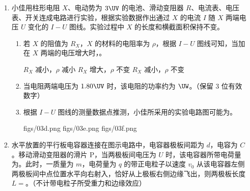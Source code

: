 \documentclass[\gkver]{gaokaozhenti}
\begin{document}
\begin{enumerate}
\begin{enumerate}
	\onepicture[align=right, w=3.17cm]{}

	\item
	小佳用柱形电阻 $X$、电动势为 $3 \UV$ 的电池、滑动变阻器 $R$、电流表、电压表、开关连成电路进行实验，根据实验数据作出通过 $X$ 的电流 $I$ 随 $X$ 两端电压 $U$ 变化的 $I-U$ 图线。实验过程中 $X$ 的长度和横截面积保持不变。

	\onepicture[align=right, w=5.59cm]{}

	\begin{enumerate}
		\item
		若 $X$ 的阻值为 $R_{X}$，$X$ 的材料的电阻率为 $\rho$，根据 $I-U$ 图线可知，当加在 $X$ 两端的电压增大时，。

		{$R_{X}$ 减小，$\rho$ 减小}
		{$R_{X}$ 增大，$\rho$ 不变}
		{$R_{X}$ 减小，$\rho$ 不变}

		\item
		当电阻两端电压为 $1.80 \UV$ 时，该电阻的功率约为 $\UW$。（保留 3 位有效数字）

		\item
		根据 $I-U$ 图线的测量数据点推测，小佳所采用的实验电路图可能为。

		{figs/03d.png}
		{figs/03e.png}
		{figs/03f.png}
	\end{enumerate}

	\item
	水平放置的平行板电容器连接在图示电路中，电容器极板间距为 $d$，电容为 $C$。移动滑动变阻器的滑片 P，当两极板间电压为 $U$ 时，该电容器所带电荷量为。此时，一质量为 $m$，电荷量为 $q$ 的带正电粒子以速度 $v_{0}$ 从该电容器左侧两极板间中点位置水平向右射入，恰好从上极板右侧边缘飞出，则两极板长度 $L=$。（不计带电粒子所受重力和边缘效应）

	\onepicture[align=right, w=3.42cm]{}
\end{enumerate}
\end{enumerate}
\end{document}
